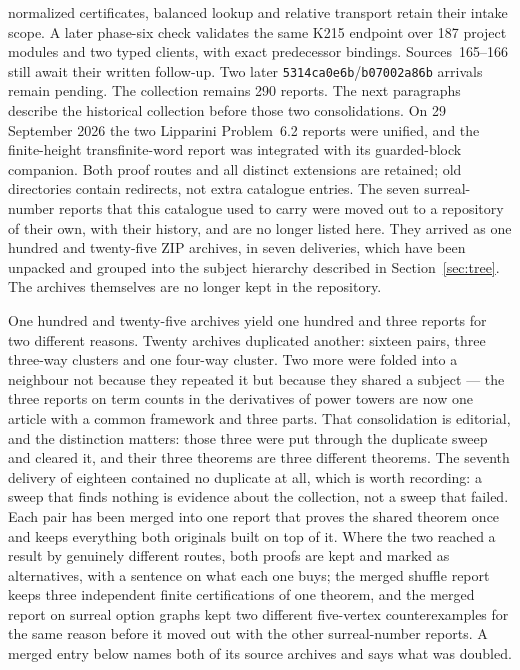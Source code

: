\documentclass[11pt]{article}
\begin{document}
normalized certificates, balanced lookup and relative transport retain their
intake scope. A later phase-six check validates the same K215 endpoint over
187 project modules and two typed clients, with exact predecessor bindings.
Sources~165--166 still await their written follow-up. Two later
\texttt{5314ca0e6b}/\texttt{b07002a86b} arrivals remain pending.
The collection remains 290 reports.
The next paragraphs describe the historical collection before those two
consolidations. On 29 September 2026 the two Lipparini Problem~6.2 reports
were unified, and the finite-height transfinite-word report was integrated
with its guarded-block companion. Both proof routes and all distinct
extensions are retained; old directories contain redirects, not extra
catalogue entries.  The seven surreal-number reports that this catalogue
used to carry were moved out to a repository of their own, with their history,
and are no longer listed here.  They arrived as one hundred and twenty-five ZIP
archives, in seven deliveries, which have been unpacked and grouped into the
subject hierarchy described in Section~\ref{sec:tree}.  The archives themselves
are no longer kept in the repository.

One hundred and twenty-five archives yield one hundred and three reports for
two different reasons.  Twenty archives duplicated another: sixteen pairs, three
three-way clusters and one four-way cluster.  Two more were folded into a
neighbour not because they repeated it but because they shared a subject --- the
three reports on term counts in the derivatives of power towers are now one
article with a common framework and three parts.  That consolidation is
editorial, and the distinction matters: those three were put through the
duplicate sweep and cleared it, and their three theorems are three different
theorems.  The seventh delivery of eighteen contained no duplicate at all, which
is worth recording: a sweep that finds nothing is evidence about the collection,
not a sweep that failed.
Each pair has been merged into one report that proves the
shared theorem once and keeps everything both originals built on top of it.
Where the two reached a result by genuinely different routes, both proofs are
kept and marked as alternatives, with a sentence on what each one buys; the
merged shuffle report keeps three independent finite certifications of one
theorem, and the merged report on surreal option graphs kept two different
five-vertex counterexamples for the same reason before it moved out with the
other surreal-number reports.  A merged entry below names both of its
source archives and says what was doubled.
\end{document}
